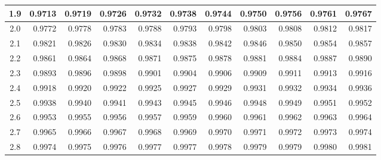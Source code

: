 \begin{table}[H]
\begin{center}
{\begin{tabular}{c | rrrrr | rrrrr |}
  1.9 & \normalsize{0.9713} & \normalsize{0.9719} & \normalsize{0.9726} & \normalsize{0.9732} & \normalsize{0.9738} & \normalsize{0.9744} & \normalsize{0.9750} & \normalsize{0.9756} & \normalsize{0.9761} & \normalsize{0.9767} \\
  \hline
  \hline
  2.0 & \normalsize{0.9772} & \normalsize{0.9778} & \normalsize{0.9783} & \normalsize{0.9788} & \normalsize{0.9793} & \normalsize{0.9798} & \normalsize{0.9803} & \normalsize{0.9808} & \normalsize{0.9812} & \normalsize{0.9817} \\
  2.1 & \normalsize{0.9821} & \normalsize{0.9826} & \normalsize{0.9830} & \normalsize{0.9834} & \normalsize{0.9838} & \normalsize{0.9842} & \normalsize{0.9846} & \normalsize{0.9850} & \normalsize{0.9854} & \normalsize{0.9857} \\
  2.2 & \normalsize{0.9861} & \normalsize{0.9864} & \normalsize{0.9868} & \normalsize{0.9871} & \normalsize{0.9875} & \normalsize{0.9878} & \normalsize{0.9881} & \normalsize{0.9884} & \normalsize{0.9887} & \normalsize{0.9890} \\
  2.3 & \normalsize{0.9893} & \normalsize{0.9896} & \normalsize{0.9898} & \normalsize{0.9901} & \normalsize{0.9904} & \normalsize{0.9906} & \normalsize{0.9909} & \normalsize{0.9911} & \normalsize{0.9913} & \normalsize{0.9916} \\
  2.4 & \normalsize{0.9918} & \normalsize{0.9920} & \normalsize{0.9922} & \normalsize{0.9925} & \normalsize{0.9927} & \normalsize{0.9929} & \normalsize{0.9931} & \normalsize{0.9932} & \normalsize{0.9934} & \normalsize{0.9936} \\
  \hline
  2.5 & \normalsize{0.9938} & \normalsize{0.9940} & \normalsize{0.9941} & \normalsize{0.9943} & \normalsize{0.9945} & \normalsize{0.9946} & \normalsize{0.9948} & \normalsize{0.9949} & \normalsize{0.9951} & \normalsize{0.9952} \\
  2.6 & \normalsize{0.9953} & \normalsize{0.9955} & \normalsize{0.9956} & \normalsize{0.9957} & \normalsize{0.9959} & \normalsize{0.9960} & \normalsize{0.9961} & \normalsize{0.9962} & \normalsize{0.9963} & \normalsize{0.9964} \\
  2.7 & \normalsize{0.9965} & \normalsize{0.9966} & \normalsize{0.9967} & \normalsize{0.9968} & \normalsize{0.9969} & \normalsize{0.9970} & \normalsize{0.9971} & \normalsize{0.9972} & \normalsize{0.9973} & \normalsize{0.9974} \\
  2.8 & \normalsize{0.9974} & \normalsize{0.9975} & \normalsize{0.9976} & \normalsize{0.9977} & \normalsize{0.9977} & \normalsize{0.9978} & \normalsize{0.9979} & \normalsize{0.9979} & \normalsize{0.9980} & \normalsize{0.9981} \\

\end{tabular}}
\end{center}
\end{table}
